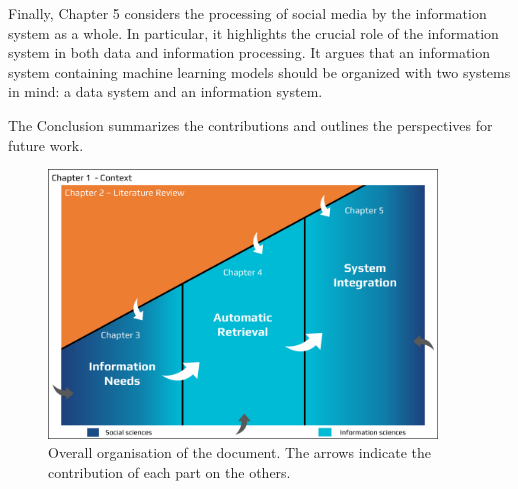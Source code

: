 Finally, Chapter 5 considers the processing of social media by the information system as a whole.
In particular, it highlights the crucial role of the information system in both data and information processing.
It argues that an information system containing machine learning models should be organized with two systems in mind: a data system and an information system.

The Conclusion summarizes the contributions and outlines the perspectives for future work.

\begin{figure}[ht]
    \centering
    \includegraphics[width=0.92\textwidth,keepaspectratio]{figures/chap-0/big-picture.pdf}
    \caption{Overall organisation of the document. The arrows indicate the contribution of each part on the others.}
    \label{introduction:big-picture}
\end{figure}


